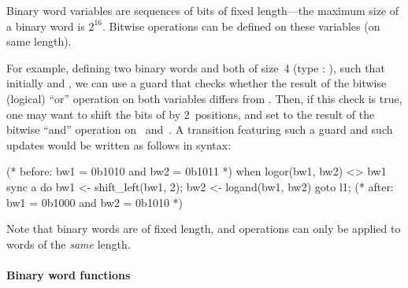 Binary word variables are sequences of bits of fixed length---the maximum size of a binary word is $2^{16}$.
Bitwise operations can be defined on these variables (on same length).

For example, defining two binary words  and  both of size~4 (type : ), such that initially  and , we can use a guard  that checks whether the result of the bitwise (logical) ``or'' operation on both variables differs from .
Then, if this check is true, one may want to shift the bits of  by 2~positions, and set  to the result of the bitwise ``and'' operation on~ and~.
%
A transition featuring such a guard and such updates would be written as follows in \imitator{} syntax:

\begin{IMITATORmodel}
(* before: bw1 = 0b1010 and bw2 = 0b1011 *)
when logor(bw1, bw2) <> bw1 sync a do {bw1 <- shift_left(bw1, 2); bw2 <- logand(bw1, bw2)} goto l1;
(* after: bw1 = 0b1000 and bw2 = 0b1010 *)
\end{IMITATORmodel}

Note that binary words are of fixed length, and operations can only be applied to words of the \emph{same} length.




\paragraph{Binary word functions}

